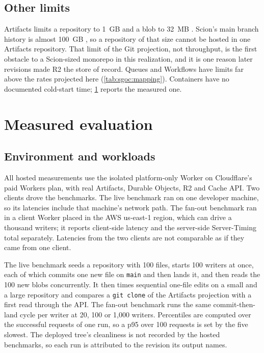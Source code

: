 \documentclass[11pt,letterpaper]{article}
\theoremstyle{definition}
\theoremstyle{remark}
\begin{document}
\subsection{Other limits}

Artifacts limits a repository to 1~GB and a blob to 32~MB \cite{cfartifacts}. Scion's main branch history is almost 100~GB \cite{anthropic2026scion}, so a repository of that size cannot be hosted in one Artifacts repository. %
That limit of the Git projection, not throughput, is the first obstacle to a Scion-sized monorepo in this realization, and it is one reason later revisions made R2 the store of record. Queues and Workflows have limits far above the rates projected here (\cref{tab:sgoc:mapping}). Containers have no documented cold-start time; \cref{sec:sgoc:measured} reports the measured one.

\section{Measured evaluation}
\label{sec:sgoc:measured}

\subsection{Environment and workloads}

All hosted measurements use the isolated platform-only Worker on Cloudflare's paid Workers plan, with real Artifacts, Durable Objects, R2 and Cache API. Two clients drove the benchmarks. The live benchmark ran on one developer machine, so its latencies include that machine's network path. The fan-out benchmark ran in a client Worker placed in the AWS us-east-1 region, which can drive a thousand writers; it reports client-side latency and the server-side Server-Timing total separately. Latencies from the two clients are not comparable as if they came from one client.

The live benchmark seeds a repository with 100 files, starts 100 writers at once, each of which commits one new file on \texttt{main} and then lands it, and then reads the 100 new blobs concurrently. It then times sequential one-file edits on a small and a large repository and compares a \texttt{git clone} of the Artifacts projection with a first read through the API. The fan-out benchmark runs the same commit-then-land cycle per writer at 20, 100 or 1,000 writers. Percentiles are computed over the successful requests of one run, so a p95 over 100 requests is set by the five slowest. The deployed tree's cleanliness is not recorded by the hosted benchmarks, so each run is attributed to the revision its output names.
\end{document}
